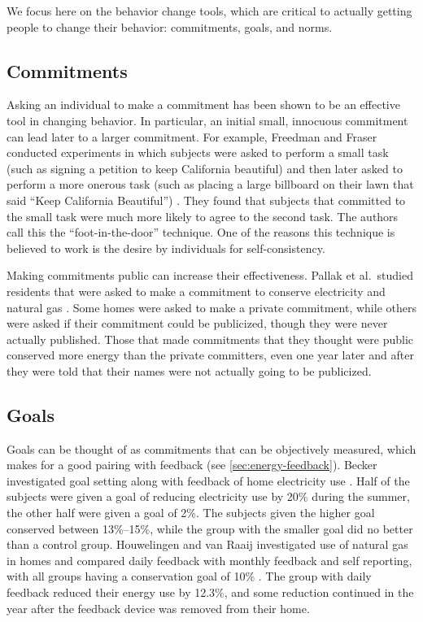 We focus here on the behavior change tools, which are critical to actually getting people to change their behavior: commitments, goals, and norms.

\subsection{Commitments}
\label{sec:rl-commitments}

Asking an individual to make a commitment has been shown to be an effective tool in changing behavior. In particular, an initial small, innocuous commitment can lead later to a larger commitment. For example, Freedman and Fraser conducted experiments in which subjects were asked to perform a small task (such as signing a petition to keep California beautiful) and then later asked to perform a more onerous task (such as placing a large billboard on their lawn that said ``Keep California Beautiful'') \cite{Freedman66}. They found that subjects that committed to the small task were much more likely to agree to the second task. The authors call this the ``foot-in-the-door'' technique. One of the reasons this technique is believed to work is the desire by individuals for self-consistency.

Making commitments public can increase their effectiveness. Pallak et al.\ studied residents that were asked to make a commitment to conserve electricity and natural gas \cite{Pallak80}. Some homes were asked to make a private commitment, while others were asked if their commitment could be publicized, though they were never actually published. Those that made commitments that they thought were public conserved more energy than the private committers, even one year later and after they were told that their names were not actually going to be publicized.

\subsection{Goals}
\label{sec:goals}

Goals can be thought of as commitments that can be objectively measured, which makes for a good pairing with feedback (see \autoref{sec:energy-feedback}). Becker investigated goal setting along with feedback of home electricity use \cite{Becker78}. Half of the subjects were given a goal of reducing electricity use by 20\% during the summer, the other half were given a goal of 2\%. The subjects given the higher goal conserved between 13\%--15\%, while the group with the smaller goal did no better than a control group. Houwelingen and van Raaij investigated use of natural gas in homes and compared daily feedback with monthly feedback and self reporting, with all groups having a conservation goal of 10\% \cite{Houwelingen89}. The group with daily feedback reduced their energy use by 12.3\%, and some reduction continued in the year after the feedback device was removed from their home.

